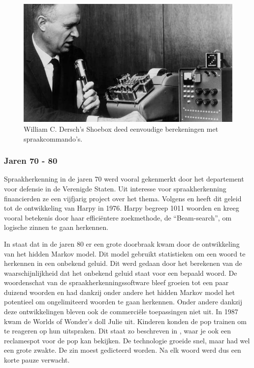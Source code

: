 \begin{figure}[h]
    \centering
    \includegraphics[width=0.7\linewidth]{img/Shoebox}
    \caption{William C. Dersch’s Shoebox deed eenvoudige berekeningen met spraakcommando's. \autocite{IBM2011}}
    \label{fig:shoebox}
\end{figure}

\subsubsection{Jaren 70 - 80}
Spraakherkenning in de jaren 70 werd vooral gekenmerkt door het departement voor defensie in de Verenigde Staten. Uit interesse voor spraakherkenning financierden ze een vijfjarig project over het thema. Volgens \textcite{Pinola2011} en \textcite{Kincaid2018} heeft dit geleid tot de ontwikkeling van Harpy in 1976. Harpy begreep 1011 woorden en kreeg vooral betekenis door haar efficiëntere zoekmethode, de ``Beam-search'', om logische zinnen te gaan herkennen.

In \textcite{Pinola2011} staat dat in de jaren 80 er een grote doorbraak kwam door de ontwikkeling van het hidden Markov model. Dit model gebruikt statistieken om een woord te herkennen in een onbekend geluid. Dit werd gedaan door het berekenen van de waarschijnlijkheid dat het onbekend geluid staat voor een bepaald woord. De woordenschat van de spraakherkenningssoftware bleef groeien tot een paar duizend woorden en had dankzij onder andere het hidden Markov model het potentieel om ongelimiteerd woorden te gaan herkennen.
Onder andere dankzij deze ontwikkelingen bleven ook de commerciële toepassingen niet uit. In 1987 kwam de Worlds of Wonder's doll Julie uit. Kinderen konden de pop trainen om te reageren op hun uitspraken. Dit staat zo beschreven in \textcite{Pinola2011}, waar je ook een reclamespot voor de pop kan bekijken. De technologie groeide snel, maar had wel een grote zwakte. De zin moest gedicteerd worden. Na elk woord werd dus een korte pauze verwacht.

